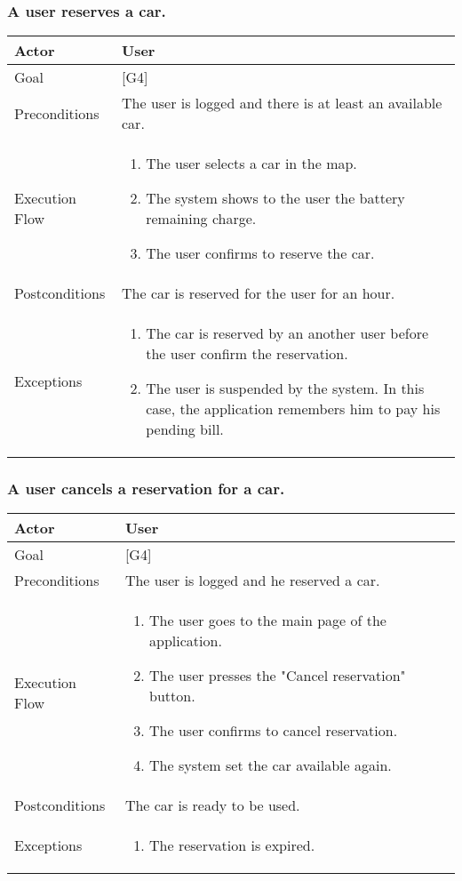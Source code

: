 \documentclass{article}
\begin{document}
	\subsubsection{A user reserves a car.}
	\begin{tabularx}{\textwidth}{  l  X  }
		\hline
		Actor & User\\
		\hline
		Goal & [G4]\\
		\hline
		Preconditions & The user is logged and there is at least an available car.\\
		\hline
		Execution Flow & \begin{enumerate}
			\item{The user selects a car in the map.}
										 \item{The system shows to the user the battery remaining charge.}
										 \item{The user confirms to reserve the car.}
										\end{enumerate}\\
		\hline
		Postconditions & The car is reserved for the user for an hour. \\
		\hline
		Exceptions & \begin{enumerate}
			\item{The car is reserved by an another user before the user confirm the reservation.}
								 \item{The user is suspended by the system. In this case, the application remembers him to pay his pending bill.}
								\end{enumerate}\\
		\hline
	\end{tabularx}

  \subsubsection{A user cancels a reservation for a car.}
	\begin{tabularx}{\textwidth}{  l  X  }
		\hline
		Actor & User\\
		\hline
		Goal & [G4]\\
		\hline
		Preconditions & The user is logged and he reserved a car.\\
		\hline
		Execution Flow & \begin{enumerate}
			               \item{The user goes to the main page of the application.}
                     \item{The user presses the "Cancel reservation" button.}
										 \item{The user confirms to cancel reservation.}
                     \item{The system set the car available again.}
										\end{enumerate}\\
		\hline
		Postconditions & The car is ready to be used. \\
		\hline
		Exceptions & \begin{enumerate}
			\item{The reservation is expired.}
								\end{enumerate}\\
		\hline
	\end{tabularx}
\end{document}
